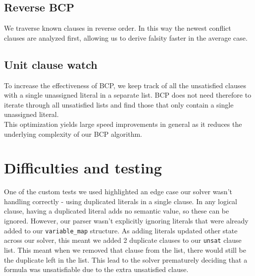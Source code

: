 \documentclass[a4paper]{article}
\begin{document}
\subsection{Reverse BCP}

We traverse known clauses in reverse order. In this way the newest conflict clauses are analyzed first, allowing us to derive falsity faster in the average case.

\subsection{Unit clause watch}

To increase the effectiveness of BCP, we keep track of all the unsatisfied clauses with a single unassigned literal in a separate list. BCP does not need therefore to iterate through all unsatisfied lists and find those that only contain a single unassigned literal.\\
This optimization yields large speed improvements in general as it reduces the underlying complexity of our BCP algorithm.

\section{Difficulties and testing}

One of the custom tests we used highlighted an edge case our solver wasn't handling correctly - using duplicated literals in a single clause. In any logical clause, having a duplicated literal adds no semantic value, so these can be ignored. However, our parser wasn't explicitly ignoring literals that were already added to our \texttt{variable\_map} structure. As adding literals updated other state across our solver, this meant we added 2 duplicate clauses to our \texttt{unsat} clause list. This meant when we removed that clause from the list, there would still be the duplicate left in the list. This lead to the solver prematurely deciding that a formula was unsatisfiable due to the extra unsatisfied clause. \\
\end{document}
